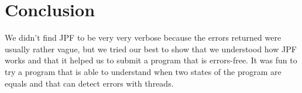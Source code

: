\documentclass[11pt, a4paper]{article}
\begin{document}
    \section{Conclusion}

    We didn't find JPF to be very very verbose because the errors returned were
    usually rather vague, but we tried our best to show that we understood how
    JPF works and that it helped us to submit a program that is errors-free.
    It was fun to try a program that is able to understand when two states
    of the program are equals and that can detect errors with threads.
\end{document}
